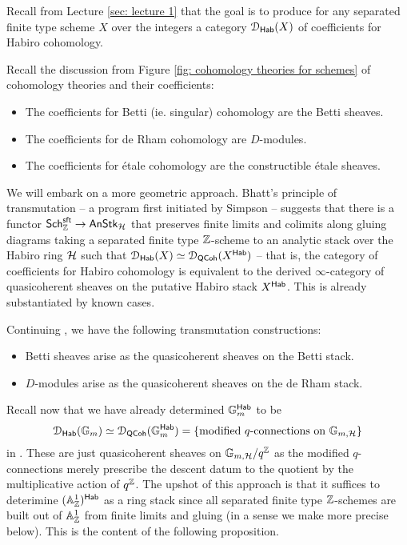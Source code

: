 Recall from Lecture \ref{sec: lecture 1} that the goal is to produce for any separated finite type scheme $X$ over the integers a category $\EuScript{D}_{\mathsf{Hab}}(X)$ of coefficients for Habiro cohomology. 
\begin{example}\label{ex: categories of coefficients}
    Recall the discussion from Figure \ref{fig: cohomology theories for schemes} of cohomology theories and their coefficients: 
    \begin{itemize}
        \item The coefficients for Betti (ie. singular) cohomology are the Betti sheaves. 
        \item The coefficients for de Rham cohomology are $D$-modules. 
        \item The coefficients for \'{e}tale cohomology are the constructible \'{e}tale sheaves.
    \end{itemize}
\end{example}
We will embark on a more geometric approach. Bhatt's principle of transmutation \cite[Rmk. 2.3.8]{FGauges} -- a program first initiated by Simpson -- suggests that there is a functor $\mathsf{Sch}^{\mathsf{sft}}_{\mathbb{Z}}\to\mathsf{AnStk}_{\mathcal{H}}$ that preserves finite limits and colimits along gluing diagrams taking a separated finite type $\mathbb{Z}$-scheme to an analytic stack over the Habiro ring $\mathcal{H}$ such that $\EuScript{D}_{\mathsf{Hab}}(X)\simeq\EuScript{D}_{\mathsf{QCoh}}(X^{\mathsf{Hab}})$ -- that is, the category of coefficients for Habiro cohomology is equivalent to the derived $\infty$-category of quasicoherent sheaves on the putative Habiro stack $X^{\mathsf{Hab}}$. This is already substantiated by known cases. 
\begin{example}
    Continuing , we have the following transmutation constructions: 
    \begin{itemize}
        \item Betti sheaves arise as the quasicoherent sheaves on the Betti stack. 
        \item $D$-modules arise as the quasicoherent sheaves on the de Rham stack. 
    \end{itemize}
\end{example}
Recall now that we have already determined $\mathbb{G}_{m}^{\mathsf{Hab}}$ to be $$\EuScript{D}_{\mathsf{Hab}}(\mathbb{G}_{m})\simeq\EuScript{D}_{\mathsf{QCoh}}(\mathbb{G}_{m}^{\mathsf{Hab}})=\left\{\text{modified }q\text{-connections on }\mathbb{G}_{m,\mathcal{H}}\right\}$$
in . These are just quasicoherent sheaves on $\mathbb{G}_{m,\mathcal{H}}/q^{\mathbb{Z}}$ as the modified $q$-connections merely prescribe the descent datum to the quotient by the multiplicative action of $q^{\mathbb{Z}}$. The upshot of this approach is that it suffices to deterimine $(\mathbb{A}^{1}_{\mathbb{Z}})^{\mathsf{Hab}}$ as a ring stack since all separated finite type $\mathbb{Z}$-schemes are built out of $\mathbb{A}^{1}_{\mathbb{Z}}$ from finite limits and gluing (in a sense we make more precise below). This is the content of the following proposition. 
